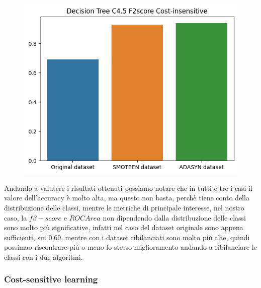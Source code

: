 \documentclass[italian,12pt,a4paper]{article}
\begin{document}
\begin{center}
		\begin{figure}[h]
			\centering
			\includegraphics[scale=0.73]{DecTree}
		\end{figure}
	
	
	\end{center}
	
	Andando a valutere i risultati ottenuti possiamo notare che in tutti e tre i casi il valore dell'accuracy è molto alta, ma questo non basta, perchè tiene conto della distribuzione delle classi, mentre le metriche di principale interesse, nel nostro caso, la $f\beta-score$ e $ROC Area$ non dipendendo dalla distribuzione delle classi sono molto più significative, infatti nel caso del dataset originale sono appena sufficienti, sui 0.69, mentre con i dataset ribilanciati sono molto più alte, quindi possimao riscontrare più o meno lo stesso miglioramento andando a ribilanciare le classi con i due algoritmi. \\
	\linebreak
	\linebreak
	
	\subsubsection{Cost-sensitive learning}
	
\end{document}
